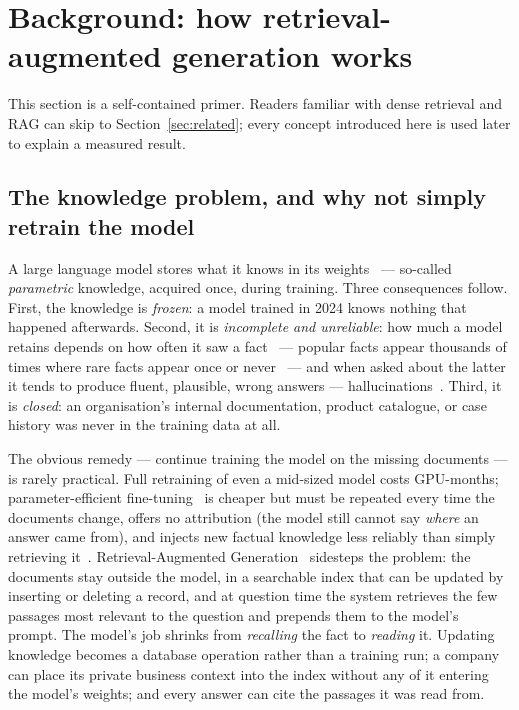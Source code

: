 \section{Background: how retrieval-augmented generation works}
\label{sec:background}

This section is a self-contained primer. Readers familiar with dense
retrieval and RAG can skip to Section~\ref{sec:related}; every concept
introduced here is used later to explain a measured result.

\subsection{The knowledge problem, and why not simply retrain the model}
\label{sec:why-rag}

A large language model stores what it knows in its
weights~\citep{brown2020gpt3,petroni2019lmkb} --- so-called
\emph{parametric} knowledge, acquired once, during training. Three
consequences follow. First, the knowledge is \emph{frozen}: a model trained
in 2024 knows nothing that happened afterwards. Second, it is
\emph{incomplete and unreliable}: how much a model retains depends on how
often it saw a fact~\citep{roberts2020knowledge,kandpal2023longtail} ---
popular facts appear thousands of times where rare facts appear once or
never~\citep{mallen2023popqa} --- and when asked about the latter it tends
to produce fluent, plausible, wrong answers ---
hallucinations~\citep{ji2023hallucination,zhang2023sirens}. Third, it is
\emph{closed}: an
organisation's internal documentation, product catalogue, or case history
was never in the training data at all.

The obvious remedy --- continue training the model on the missing documents
--- is rarely practical. Full retraining of even a mid-sized model costs
GPU-months; parameter-efficient fine-tuning~\citep{hu2022lora} is cheaper
but must be repeated every time the documents change, offers no
attribution (the model still cannot say \emph{where} an answer came
from), and injects new factual knowledge less reliably than simply
retrieving it~\citep{ovadia2024finetuning}. Retrieval-Augmented
Generation~\citep{lewis2020rag} sidesteps the problem: the documents stay
outside the model, in a searchable index that can be updated by inserting
or deleting a record, and at question time the system retrieves the few
passages most relevant to the question and prepends them to the model's
prompt. The model's job shrinks from \emph{recalling} the fact to
\emph{reading} it. Updating knowledge becomes a database operation rather than
a training run; a company can place its private business context into the
index without any of it entering the model's weights; and every answer can
cite the passages it was read from.

